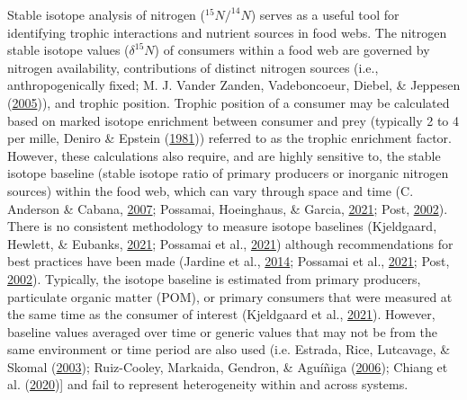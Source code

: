\documentclass [11pt, proquest] {uwthesis}[2015/03/03]
\begin{document}
Stable isotope analysis of nitrogen (\(^{15}N/^{14}N\)) serves as a
useful tool for identifying trophic interactions and nutrient sources in
food webs. The nitrogen stable isotope values (\(\delta^{15}N\)) of
consumers within a food web are governed by nitrogen availability,
contributions of distinct nitrogen sources (i.e., anthropogenically
fixed; M. J. Vander Zanden, Vadeboncoeur, Diebel, \& Jeppesen
(\protect\hyperlink{ref-VanderZanden2005}{2005})), and trophic position.
Trophic position of a consumer may be calculated based on marked isotope
enrichment between consumer and prey (typically 2 to 4 per mille, Deniro
\& Epstein (\protect\hyperlink{ref-Deniro1981}{1981})) referred to as
the trophic enrichment factor. However, these calculations also require,
and are highly sensitive to, the stable isotope baseline (stable isotope
ratio of primary producers or inorganic nitrogen sources) within the
food web, which can vary through space and time (C. Anderson \& Cabana,
\protect\hyperlink{ref-Anderson2007}{2007}; Possamai, Hoeinghaus, \&
Garcia, \protect\hyperlink{ref-Possamai2021}{2021}; Post,
\protect\hyperlink{ref-Post2002}{2002}). There is no consistent
methodology to measure isotope baselines (Kjeldgaard, Hewlett, \&
Eubanks, \protect\hyperlink{ref-Kjeldgaard2021}{2021}; Possamai et al.,
\protect\hyperlink{ref-Possamai2021}{2021}) although recommendations for
best practices have been made (Jardine et al.,
\protect\hyperlink{ref-Jardine2014}{2014}; Possamai et al.,
\protect\hyperlink{ref-Possamai2021}{2021}; Post,
\protect\hyperlink{ref-Post2002}{2002}). Typically, the isotope baseline
is estimated from primary producers, particulate organic matter (POM),
or primary consumers that were measured at the same time as the consumer
of interest (Kjeldgaard et al.,
\protect\hyperlink{ref-Kjeldgaard2021}{2021}). However, baseline values
averaged over time or generic values that may not be from the same
environment or time period are also used (i.e. Estrada, Rice, Lutcavage,
\& Skomal (\protect\hyperlink{ref-Estrada2003}{2003}); Ruiz-Cooley,
Markaida, Gendron, \& Aguíñiga
(\protect\hyperlink{ref-RuizCooley2006}{2006}); Chiang et al.
(\protect\hyperlink{ref-Chiang2020}{2020}){]} and fail to represent
heterogeneity within and across systems.
\end{document}
